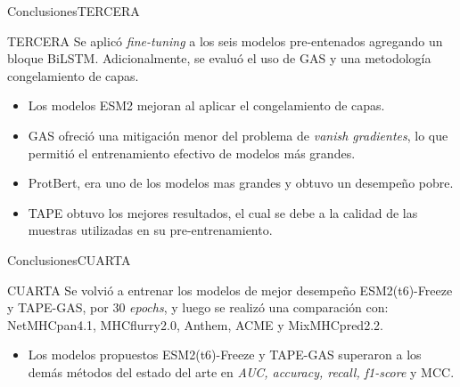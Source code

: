 \documentclass[10pt]{beamer}
\newcommand{\1}{
	\setbeamertemplate{background}{
		\texttt{[image: img/1]}
		\tikz[overlay] \fill[fill opacity=0.75,fill=white] (0,0) rectangle (-\paperwidth,\paperheight);
	}
}
\begin{document}
\begin{frame}{Conclusiones}{TERCERA}	
	\begin{block}{TERCERA}
		Se aplicó \textit{fine-tuning} a los seis modelos pre-entenados agregando un bloque BiLSTM. Adicionalmente, se evaluó el uso de GAS y una metodología congelamiento de capas. \pause
		\begin{itemize}
			\item Los modelos ESM2 mejoran al aplicar el congelamiento de capas. \pause
			\item GAS ofreció una mitigación menor del problema de \textit{vanish gradientes}, lo que permitió el entrenamiento efectivo de modelos más grandes.
			\item ProtBert, era uno de los modelos mas grandes y obtuvo un desempeño pobre. \pause
			\item TAPE obtuvo los mejores resultados, el cual se debe a la calidad de las muestras utilizadas en su pre-entrenamiento.
		\end{itemize}			
	\end{block}	
\end{frame}

\begin{frame}{Conclusiones}{CUARTA}	
	\begin{block}{CUARTA}
		Se volvió a entrenar los modelos de mejor desempeño ESM2(t6)-Freeze y TAPE-GAS, por 30 \textit{epochs},  y luego se realizó una comparación con: NetMHCpan4.1, MHCflurry2.0, Anthem, ACME y MixMHCpred2.2. \pause
		\begin{itemize}
			\item Los modelos propuestos ESM2(t6)-Freeze y TAPE-GAS superaron a los demás métodos del estado del arte en \textit{AUC, accuracy, recall, f1-score} y MCC. 
		\end{itemize}			
	\end{block}	
\end{frame}
\end{document}
